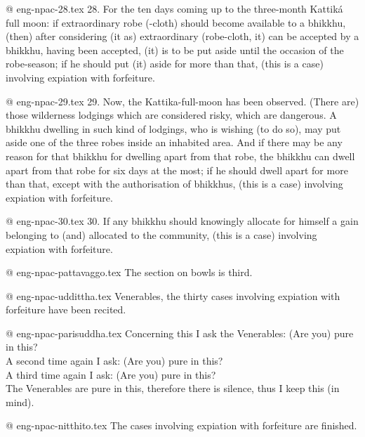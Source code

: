 @ eng-npac-28.tex
28. For the ten days coming up to the three-month Kattiká full moon: if extraordinary robe (-cloth) should become available to a bhikkhu, (then) after considering (it as) extraordinary (robe-cloth, it) can be accepted by a bhikkhu, having been accepted, (it) is to be put aside until the occasion of the robe-season; if he should put (it) aside for more than that, (this is a case) involving expiation with forfeiture.

@ eng-npac-29.tex
29. Now, the Kattika-full-moon has been observed. (There are) those wilderness lodgings which are considered risky, which are dangerous. A bhikkhu dwelling in such kind of lodgings, who is wishing (to do so), may put aside one of the three robes inside an inhabited area. And if there may be any reason for that bhikkhu for dwelling apart from that robe, the bhikkhu can dwell apart from that robe for six days at the most; if he should dwell apart for more than that, except with the authorisation of bhikkhus, (this is a case) involving expiation with forfeiture.

@ eng-npac-30.tex
30. If any bhikkhu should knowingly allocate for himself a gain belonging to (and) allocated to the  community, (this is a case) involving expiation with forfeiture.

@ eng-npac-pattavaggo.tex
The section on bowls is third.

@ eng-npac-uddittha.tex
Venerables, the thirty cases involving expiation with forfeiture have been recited.

@ eng-npac-parisuddha.tex
Concerning this I ask the Venerables: (Are you) pure in this?\\
A second time again I ask: (Are you) pure in this?\\
A third time again I ask: (Are you) pure in this?\\
The Venerables are pure in this, therefore there is silence, thus I keep this (in mind).

@ eng-npac-nitthito.tex
The cases involving expiation with forfeiture are finished.
